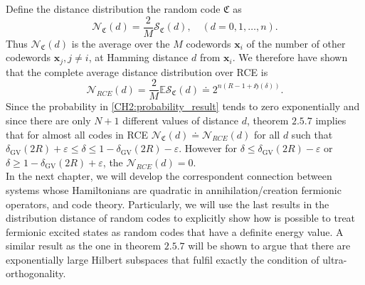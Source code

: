 \indent Define the distance distribution the random code $\mathfrak{C}$ as
\begin{equation}
\mathcal{N}_{\mathfrak{C}}(d)  = \frac{2}{M} \mathcal{S}_{\mathfrak{C}}(d), \quad  (d=0,1,\ldots , n).
\end{equation}
Thus $\mathcal{N}_{\mathfrak{C}}(d)$ is the average over the $M$ codewords $\mathbf{x}_i$ of the number of other codewords $\mathbf{x}_j, j \neq i$, at Hamming distance $d$ from $\mathbf{x}_i$.
\indent We therefore have shown that the complete average distance distribution over RCE is
\begin{equation}
\mathcal{N}_{RCE}(d)  = \frac{2}{M} \mathbb{E} \mathcal{S}_{\mathfrak{C}}(d) \doteq 2^{n(R-1+\mathfrak{H}(\delta))}.
\end{equation}
Since the probability in \eqref{CH2:probability_result} tends to zero exponentially and since there are only $N+1$ different values of distance $d$, theorem $2.5.7$ implies that for almost all codes in RCE $\mathcal{N}_{\mathfrak{C}}(d) \doteq \mathcal{N}_{RCE}(d)$ for all $d$ such that $\delta_{\mathrm{GV}}(2 R)+\varepsilon \leq \delta \leq 1-\delta_{\mathrm{GV}}(2 R)-\varepsilon$. However for $\delta \leq \delta_{\mathrm{GV}}(2 R)-\varepsilon$ or $\delta \geq 1-\delta_{\mathrm{GV}}(2 R)+\varepsilon$, the $\mathcal{N}_{RCE}(d)=0$.\\


In the next chapter, we will develop the correspondent connection between systems whose Hamiltonians are quadratic in annihilation/creation fermionic operators, and code theory. Particularly, we will use the last results in the distribution distance of random codes to explicitly show how is possible to treat fermionic excited states as random codes that have a definite energy value. A similar result as the one in theorem $2.5.7$ will be shown to argue that there are exponentially large Hilbert subspaces that fulfil exactly the condition of ultra-orthogonality.
